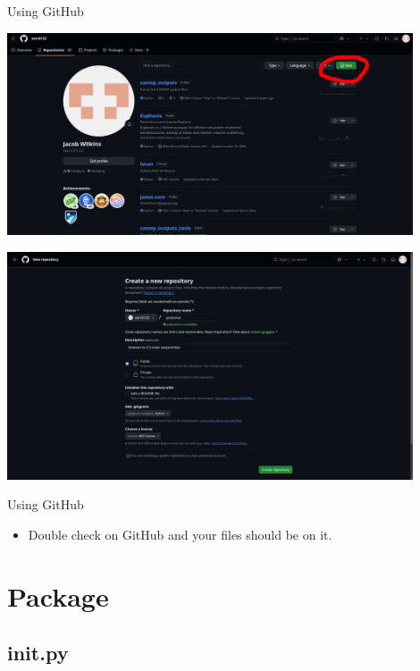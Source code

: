 \documentclass[usenames,dvipsnames]{beamer}
\begin{document}
\begin{frame}{Using GitHub}
     {
        \vspace{-3em}
        \begin{center}
            \includegraphics[width=0.9\textwidth]{new-repo.jpg}
        \end{center}
    }
     {
        \vspace{-3em}
        \begin{center}
            \includegraphics[width=0.9\textwidth]{creatingrepo.jpg}
        \end{center}
    }
\end{frame}

\begin{frame}{Using GitHub}
    \begin{itemize}[<+->]
        \item{}Double check on GitHub and your files should be on it.
    \end{itemize}
\end{frame}

\section{Package}

\subsection{init.py}
\end{document}
